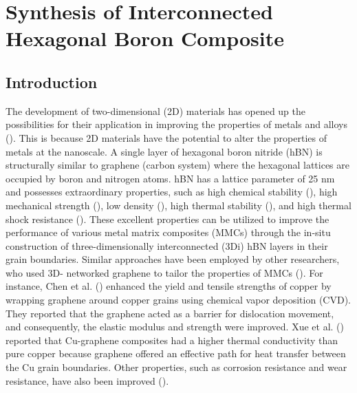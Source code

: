 \newpage {}
\section{Synthesis of Interconnected Hexagonal Boron Composite}



\subsection{Introduction}

The development of two-dimensional (2D) materials has opened up the possibilities for their application in improving the properties of metals and alloys (\cite {bartolucci2011graphene, chu2014enhanced, yang2018microstructure, li2019thermal}). This is because 2D materials have the potential to alter the properties of metals at the nanoscale. A single layer of hexagonal boron nitride (hBN) is structurally similar to graphene (carbon system) where the hexagonal lattices are occupied by boron and nitrogen atoms. hBN has a lattice parameter of 25 nm and possesses extraordinary properties, such as high chemical stability (\cite{singh2018effect}), high mechanical strength (\cite{singh2018effect}), low density (\cite{elkady2015physico}), high thermal stability (\cite{liu2013ultrathin}), and high thermal shock resistance (\cite{duan2016review}). These excellent properties can be utilized to improve the performance of various metal matrix composites (MMCs) through the in-situ construction of three-dimensionally interconnected (3Di) hBN layers in their grain boundaries. Similar approaches have been employed by other researchers, who used 3D- networked graphene to tailor the properties of MMCs (\cite{li2019thermal, chen2016fabrication, kim2018rapid, song2018hydrogen}). For instance, Chen et al. (\cite{chen2016fabrication}) enhanced the yield and tensile strengths of copper by wrapping graphene around copper grains using chemical vapor deposition (CVD). They reported that the graphene acted as a barrier for dislocation movement, and consequently, the elastic modulus and strength were improved. Xue et al. (\cite{li2019thermal}) reported that Cu-graphene composites had a higher thermal conductivity than pure copper because graphene offered an effective path for heat transfer between the Cu grain boundaries. Other properties, such as corrosion resistance and wear resistance, have also been improved (\cite{wu2019high, tripathi2017graphene}).


